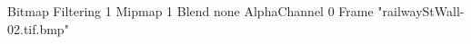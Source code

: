 {Bitmap
	{Filtering 1}
	{Mipmap 1}
	{Blend none}
	{AlphaChannel 0}
	{Frame "railwayStWall-02.tif.bmp"}
}
